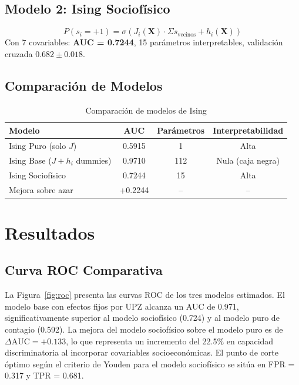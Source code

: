 \documentclass[12pt,a4paper]{article}
\begin{document}
\subsection{Modelo 2: Ising Sociofísico}
\begin{equation}
P(s_i=+1) = \sigma\left(J_i(\mathbf{X}) \cdot \Sigma s_{\text{vecinos}} + h_i(\mathbf{X})\right)
\end{equation}
Con 7 covariables: \textbf{AUC = 0.7244}, 15 parámetros interpretables, validación cruzada $0.682 \pm 0.018$.

\subsection{Comparación de Modelos}

\begin{table}[H]
\centering
\caption{Comparación de modelos de Ising}
\label{tab:comparacion}
\begin{tabular}{@{}lccc@{}}
\toprule
\textbf{Modelo} & \textbf{AUC} & \textbf{Parámetros} & \textbf{Interpretabilidad} \\
\midrule
Ising Puro (solo $J$) & 0.5915 & 1 & Alta \\
Ising Base ($J + h_i$ dummies) & 0.9710 & 112 & Nula (caja negra) \\
Ising Sociofísico & 0.7244 & 15 & Alta \\
\rowcolor{yellow!20}
Mejora sobre azar & +0.2244 & -- & -- \\
\bottomrule
\end{tabular}
\end{table}

\section{Resultados}

\subsection{Curva ROC Comparativa}

La Figura~\ref{fig:roc} presenta las curvas ROC de los tres modelos estimados. El modelo base con efectos fijos por UPZ alcanza un AUC de 0.971, significativamente superior al modelo sociofísico (0.724) y al modelo puro de contagio (0.592). La mejora del modelo sociofísico sobre el modelo puro es de $\Delta\text{AUC} = +0.133$, lo que representa un incremento del 22.5\% en capacidad discriminatoria al incorporar covariables socioeconómicas. El punto de corte óptimo según el criterio de Youden para el modelo sociofísico se sitúa en FPR = 0.317 y TPR = 0.681.
\end{document}

